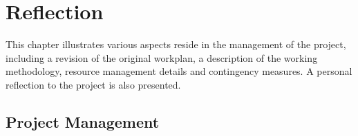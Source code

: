 \chapter{Reflection}

This chapter illustrates various aspects reside in the management of the project, including a revision of the original workplan, a description of the working methodology, resource management details and contingency measures. A personal reflection to the project is also presented. 

\section{Project Management}

